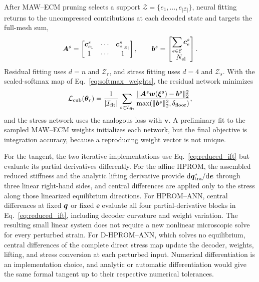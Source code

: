 After MAW--ECM pruning selects a support $\mathcal Z=\{e_1,\ldots,e_{|\mathcal Z|}\}$, neural fitting returns to the uncompressed contributions at each decoded state and targets the full-mesh sum,
\begin{equation}
 \bm A^s=
 \begin{bmatrix}
  \bm c_{e_1}^s&\cdots&\bm c_{e_{|\mathcal Z|}}^s\\
  1&\cdots&1
 \end{bmatrix},
 \qquad
 \bm b^s=
 \begin{bmatrix}
  \displaystyle\sum_{e\in\mathcal E}\bm c_e^s\\
  N_{\rm el}
 \end{bmatrix}.
 \label{eq:statewise_cubature_appendix}
\end{equation}
Residual fitting uses $d=n$ and $\mathcal Z_r$, and stress fitting uses $d=4$ and $\mathcal Z_s$. With the scaled-softmax map of Eq.~\eqref{eq:softmax_weights}, the residual network minimizes
\begin{equation}
 \mathcal L_{\rm cub}(\bm\theta_r)=
 \frac{1}{|\mathcal I_{\rm fit}|}
 \sum_{s\in\mathcal I_{\rm fit}}
 \frac{\|\bm A^s\bm w(\bm\xi^s)-\bm b^s\|_2^2}
      {\max(\|\bm b^s\|_2^2,\delta_{\rm floor})},
\end{equation}
and the stress network uses the analogous loss with $\bm v$. A preliminary fit to the sampled MAW--ECM weights initializes each network, but the final objective is integration accuracy, because a reproducing weight vector is not unique.

For the tangent, the two iterative implementations use Eq.~\eqref{eq:reduced_ift} but evaluate its partial derivatives differently. For the affine HPROM, the assembled reduced stiffness and the analytic lifting derivative provide $\mathrm d\bm q_{\rm tra}^*/\mathrm d\bm e$ through three linear right-hand sides, and central differences are applied only to the stress along those linearized equilibrium directions. For HPROM--ANN, central differences at fixed $\bm q$ or fixed $\ee$ evaluate all four partial-derivative blocks in Eq.~\eqref{eq:reduced_ift}, including decoder curvature and weight variation. The resulting small linear system does not require a new nonlinear microscopic solve for every perturbed strain. For D-HPROM--ANN, which solves no equilibrium, central differences of the complete direct stress map update the decoder, weights, lifting, and stress conversion at each perturbed input. Numerical differentiation is an implementation choice, and analytic or automatic differentiation would give the same formal tangent up to their respective numerical tolerances.

